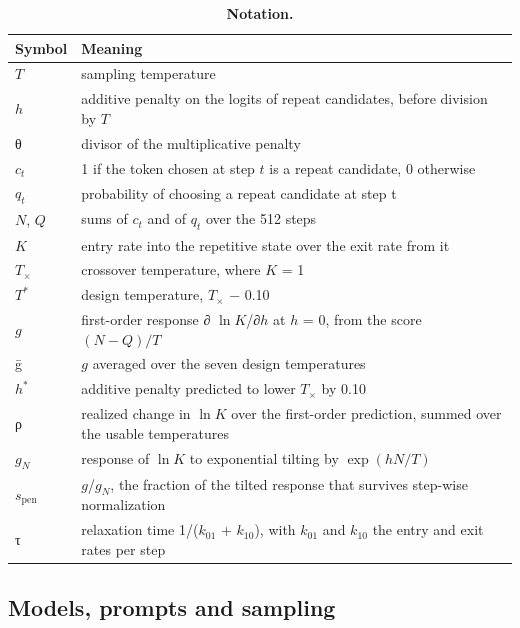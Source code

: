\documentclass[aps,prx,onecolumn,superscriptaddress,longbibliography]{revtex4-2}
\begin{document}
\begin{table}[htbp]
\centering
\small
\setlength{\tabcolsep}{6pt}
\renewcommand{\thetable}{A1}
\caption{\textbf{Notation.}}
\label{tabA1}
\begin{tabular}{@{}ll@{}}
\toprule
Symbol & Meaning \\
\midrule
\(T\) & sampling temperature \\
\(h\) & additive penalty on the logits of repeat candidates, before division by \(T\) \\
θ & divisor of the multiplicative penalty \\
\(c_{t}\) & 1 if the token chosen at step \(t\) is a repeat candidate, 0 otherwise \\
\(q_{t}\) & probability of choosing a repeat candidate at step t \\
\(N\), \(Q\) & sums of \(c_{t}\) and of \(q_{t}\) over the 512 steps \\
\(K\) & entry rate into the repetitive state over the exit rate from it \\
\(T_{\times}\) & crossover temperature, where \(K\) = 1 \\
\(T^*\) & design temperature, \(T_{\times}\) − 0.10 \\
\(g\) & first-order response ∂ \(\ln K\)/∂\(h\) at \(h\) = 0, from the score \((N-Q)/T\) \\
ḡ & \(g\) averaged over the seven design temperatures \\
\(h^*\) & additive penalty predicted to lower \(T_{\times}\) by 0.10 \\
ρ & realized change in \(\ln K\) over the first-order prediction, summed over the usable temperatures \\
\(g_{N}\) & response of \(\ln K\) to exponential tilting by \(\exp(hN/T)\) \\
\(s_{\mathrm{pen}}\) & \(g\)/\(g_{N}\), the fraction of the tilted response that survives step-wise normalization \\
τ & relaxation time 1/(\(k_{01}\) + \(k_{10}\)), with \(k_{01}\) and \(k_{10}\) the entry and exit rates per step \\
\bottomrule
\end{tabular}
\end{table}


\subsection{Models, prompts and sampling}
\end{document}

